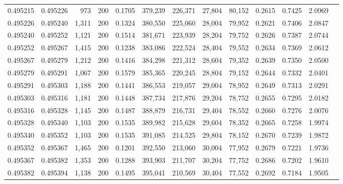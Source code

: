 \begin{tabular}{rrrrrrrrrrrrr}
0.495215 & 0.495226 &    973 & 200 &                                     0.1705 & 379,239 & 226,371 &  27,804 &  80,152 & 0.2615 & 0.7425 & 2.0969 \\
0.495226 & 0.495240 &  1,311 & 200 &                                     0.1324 & 380,550 & 225,060 &  28,004 &  79,952 & 0.2621 & 0.7406 & 2.0847 \\
0.495240 & 0.495252 &  1,121 & 200 &                                     0.1514 & 381,671 & 223,939 &  28,204 &  79,752 & 0.2626 & 0.7387 & 2.0744 \\
0.495252 & 0.495267 &  1,415 & 200 &                                     0.1238 & 383,086 & 222,524 &  28,404 &  79,552 & 0.2634 & 0.7369 & 2.0612 \\
0.495267 & 0.495279 &  1,212 & 200 &                                     0.1416 & 384,298 & 221,312 &  28,604 &  79,352 & 0.2639 & 0.7350 & 2.0500 \\
0.495279 & 0.495291 &  1,067 & 200 &                                     0.1579 & 385,365 & 220,245 &  28,804 &  79,152 & 0.2644 & 0.7332 & 2.0401 \\
0.495291 & 0.495303 &  1,188 & 200 &                                     0.1441 & 386,553 & 219,057 &  29,004 &  78,952 & 0.2649 & 0.7313 & 2.0291 \\
0.495303 & 0.495316 &  1,181 & 200 &                                     0.1448 & 387,734 & 217,876 &  29,204 &  78,752 & 0.2655 & 0.7295 & 2.0182 \\
0.495316 & 0.495328 &  1,145 & 200 &                                     0.1487 & 388,879 & 216,731 &  29,404 &  78,552 & 0.2660 & 0.7276 & 2.0076 \\
0.495328 & 0.495340 &  1,103 & 200 &                                     0.1535 & 389,982 & 215,628 &  29,604 &  78,352 & 0.2665 & 0.7258 & 1.9974 \\
0.495340 & 0.495352 &  1,103 & 200 &                                     0.1535 & 391,085 & 214,525 &  29,804 &  78,152 & 0.2670 & 0.7239 & 1.9872 \\
0.495352 & 0.495367 &  1,465 & 200 &                                     0.1201 & 392,550 & 213,060 &  30,004 &  77,952 & 0.2679 & 0.7221 & 1.9736 \\
0.495367 & 0.495382 &  1,353 & 200 &                                     0.1288 & 393,903 & 211,707 &  30,204 &  77,752 & 0.2686 & 0.7202 & 1.9610 \\
0.495382 & 0.495394 &  1,138 & 200 &                                     0.1495 & 395,041 & 210,569 &  30,404 &  77,552 & 0.2692 & 0.7184 & 1.9505 \\

\end{tabular}
